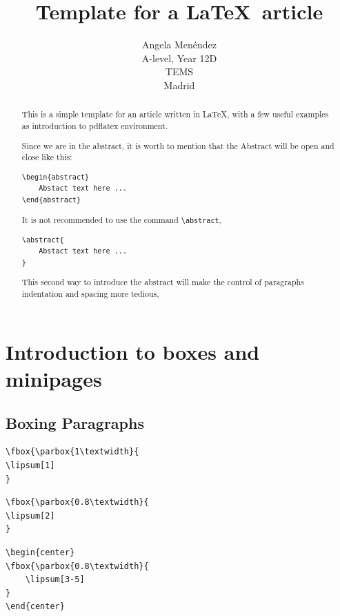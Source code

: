 \documentclass[12pt,a4paper]{article}
\title{Template for a \LaTeX\ article}
\author{Angela Menéndez\\
  \small A-level, Year 12D\\
  \small TEMS\\
  \small Madrid
}
\theoremstyle{definition}
\theoremstyle{remark}
\begin{document}
\maketitle

\begin{abstract}
This is a simple template for an article written in \LaTeX, with a few useful examples as introduction to pdflatex environment.

Since we are in the abstract, it is worth to mention that the Abstract will be open and close like this:
\begin{verbatim}
\begin{abstract}
    Abstact text here ...
\end{abstract}
\end{verbatim}

It is not recommended to use the command
\texttt{\textbackslash abstract},
\begin{verbatim}
\abstract{
    Abstact text here ...
}
\end{verbatim}

This second way to introduce the abstract will make the control of paragraphs indentation and spacing more tedious,
 

\end{abstract}

\newpage
\tableofcontents

\newpage
\section{Introduction to boxes and minipages}

\subsection{Boxing Paragraphs}

\begin{verbatim}
\fbox{\parbox{1\textwidth}{
\lipsum[1]
}
\end{verbatim}
\bigskip 

\noindent
{}
\bigskip 

\begin{verbatim}
\fbox{\parbox{0.8\textwidth}{
\lipsum[2]
}
\end{verbatim}
\bigskip 

\noindent
{}
\bigskip 

\newpage
\begin{verbatim}
\begin{center}
\fbox{\parbox{0.8\textwidth}{
    \lipsum[3-5]
}
\end{center}
\end{verbatim}
\bigskip 
\end{document}

